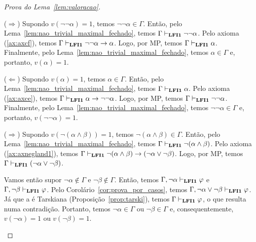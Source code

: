 \begin{proof}[Prova do Lema~\ref{lem:valoracao}]
\begin{provaporcasos}
\begin{adjustwidth}{1cm}{}
                        \end{adjustwidth}


                        \begin{adjustwidth}{1cm}{}
                            
                            \noindent ($\Longrightarrow$) Supondo $v(\neg \neg \alpha) = 1$, temos $\neg \neg \alpha \in \Gamma$. Então, pelo Lema~\ref{lem:nao_trivial_maximal_fechado}, temos $\Gamma \vdash_{{\normalfont\textbf{LFI1}}{}} \neg \neg \alpha$. Pelo axioma (\ref{ax:axcf}), temos $\Gamma \vdash_{{\normalfont\textbf{LFI1}}{}} \neg \neg \alpha \to \alpha$. Logo, por MP, temos $\Gamma \vdash_{{\normalfont\textbf{LFI1}}{}} \alpha$. Finalmente, pelo Lema~\ref{lem:nao_trivial_maximal_fechado}, temos $\alpha \in \Gamma$ e, portanto, $v(\alpha) = 1$.

                            \noindent ($\Longleftarrow$) Supondo $v(\alpha) = 1$, temos $\alpha \in \Gamma$. Então, pelo Lema~\ref{lem:nao_trivial_maximal_fechado}, temos $\Gamma \vdash_{{\normalfont\textbf{LFI1}}{}} \alpha$. Pelo axioma (\ref{ax:axce}), temos $\Gamma \vdash_{{\normalfont\textbf{LFI1}}{}} \alpha \to \neg \neg \alpha$. Logo, por MP, temos $\Gamma \vdash_{{\normalfont\textbf{LFI1}}{}} \neg \neg \alpha$. Finalmente, pelo Lema~\ref{lem:nao_trivial_maximal_fechado}, temos $\neg \neg \alpha \in \Gamma$ e, portanto, $v(\neg \neg \alpha) = 1$.

                        \end{adjustwidth}


                        \begin{adjustwidth}{1cm}{}
                            
                            \noindent ($\Longrightarrow$) Supondo $v(\neg (\alpha \land \beta)) = 1$, temos $\neg (\alpha \land \beta) \in \Gamma$. Então, pelo Lema~\ref{lem:nao_trivial_maximal_fechado}, temos $\Gamma \vdash_{{\normalfont\textbf{LFI1}}{}} \neg (\alpha \land \beta)$. Pelo axioma (\ref{ax:axnegland1}), temos $\Gamma \vdash_{{\normalfont\textbf{LFI1}}{}} \neg (\alpha \land \beta) \to (\neg \alpha \lor \neg \beta)$. Logo, por MP, temos $\Gamma \vdash_{{\normalfont\textbf{LFI1}}{}} (\neg \alpha \lor \neg \beta)$.

                            \noindent Vamos então supor $\neg \alpha \not \in \Gamma$ e $\neg \beta \not \in \Gamma$. Então, temos $\Gamma, \neg \alpha \vdash_{{\normalfont\textbf{LFI1}}{}} \varphi$ e $\Gamma, \neg \beta \vdash_{{\normalfont\textbf{LFI1}}{}} \varphi$. Pelo Corolário~\ref{cor:prova_por_casos}, temos $\Gamma, \neg \alpha \lor \neg \beta \vdash_{{\normalfont\textbf{LFI1}}{}} \varphi$. Já que a \lfium{} é Tarskiana (Proposição~\ref{prop:tarski}), temos $\Gamma \vdash_{{\normalfont\textbf{LFI1}}{}} \varphi$, o que resulta numa contradição. Portanto, temos $\neg \alpha \in \Gamma$ ou $\neg \beta \in \Gamma$ e, consequentemente, $v(\neg \alpha) = 1$ ou $v(\neg \beta) = 1$.
                            

\end{adjustwidth}
\end{provaporcasos}
\end{proof}
